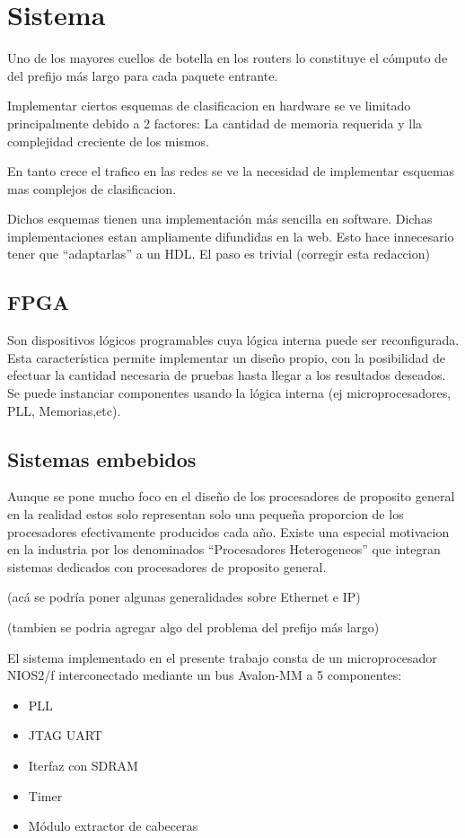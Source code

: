 \chapter{Sistema}


Uno de los mayores cuellos de botella en los routers lo constituye el cómputo de del prefijo más largo para cada paquete entrante.

Implementar ciertos esquemas de clasificacion en hardware se ve limitado principalmente debido a 2 factores: La cantidad de memoria requerida y lla complejidad creciente de los mismos.

En tanto crece el trafico en las redes se ve la necesidad de implementar esquemas mas complejos de clasificacion.

Dichos esquemas tienen una implementación más sencilla en software. Dichas implementaciones estan ampliamente difundidas en la web.
Esto hace innecesario tener que “adaptarlas” a un HDL. El paso es trivial (corregir esta redaccion)

\section{FPGA}
Son dispositivos lógicos programables cuya lógica interna puede ser reconfigurada. Esta característica permite implementar un diseño propio, con la posibilidad de efectuar la cantidad necesaria de pruebas hasta llegar a los resultados deseados. Se puede instanciar componentes usando la lógica interna (ej microprocesadores, PLL, Memorias,etc).

\section{Sistemas embebidos}
Aunque se pone mucho foco en el  diseño de los procesadores de proposito general en la realidad estos solo representan solo una pequeña proporcion de los procesadores efectivamente producidos cada año.  Existe una especial motivacion en la industria por los denominados “Procesadores Heterogeneos” que integran sistemas dedicados con procesadores de proposito general.

(acá se podría poner algunas generalidades sobre Ethernet e IP)

(tambien se podria agregar algo del problema del prefijo más largo)


El sistema implementado en el presente trabajo consta de un microprocesador NIOS2/f interconectado mediante un bus Avalon-MM a 5 componentes: 
\begin{itemize}
\item PLL
\item JTAG UART
\item Iterfaz con SDRAM
\item Timer
\item Módulo extractor de cabeceras
\end{itemize}

